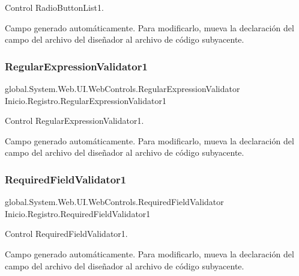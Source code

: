 Control Radio\+Button\+List1. 

Campo generado automáticamente. Para modificarlo, mueva la declaración del campo del archivo del diseñador al archivo de código subyacente. \mbox{\label{class_inicio_1_1_registro_a1d327341db3c92117be1c5e828fe2bf9}} 
\subsubsection{\texorpdfstring{RegularExpressionValidator1}{RegularExpressionValidator1}}
{\footnotesize\ttfamily global.\+System.\+Web.\+U\+I.\+Web\+Controls.\+Regular\+Expression\+Validator Inicio.\+Registro.\+Regular\+Expression\+Validator1\hspace{0.3cm}{\ttfamily [protected]}}



Control Regular\+Expression\+Validator1. 

Campo generado automáticamente. Para modificarlo, mueva la declaración del campo del archivo del diseñador al archivo de código subyacente. \mbox{\label{class_inicio_1_1_registro_af596d0fdac782957e6f85a4e5d8f3ee3}} 
\subsubsection{\texorpdfstring{RequiredFieldValidator1}{RequiredFieldValidator1}}
{\footnotesize\ttfamily global.\+System.\+Web.\+U\+I.\+Web\+Controls.\+Required\+Field\+Validator Inicio.\+Registro.\+Required\+Field\+Validator1\hspace{0.3cm}{\ttfamily [protected]}}



Control Required\+Field\+Validator1. 

Campo generado automáticamente. Para modificarlo, mueva la declaración del campo del archivo del diseñador al archivo de código subyacente. \mbox{\label{class_inicio_1_1_registro_a315fe7dd04ad883d4acd03f25fb7c1e9}} 
